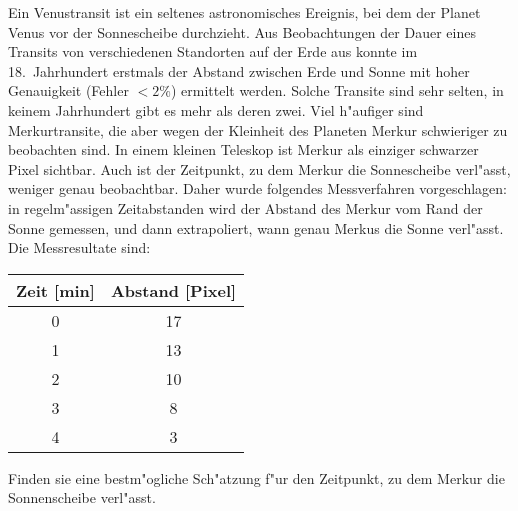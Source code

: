 Ein Venustransit ist ein seltenes astronomisches Ereignis, bei dem
der Planet Venus vor der Sonnescheibe durchzieht.
Aus Beobachtungen der Dauer eines Transits von verschiedenen Standorten
auf der Erde aus konnte im 18.~Jahrhundert erstmals der Abstand
zwischen Erde und Sonne mit hoher Genauigkeit (Fehler $< 2\%$) ermittelt
werden. Solche Transite sind sehr selten, in keinem Jahrhundert gibt es
mehr als deren zwei. Viel h"aufiger sind Merkurtransite, die aber wegen
der Kleinheit des Planeten Merkur schwieriger zu beobachten sind.
In einem kleinen Teleskop ist Merkur als einziger schwarzer Pixel
sichtbar. Auch ist der Zeitpunkt, zu dem Merkur die Sonnescheibe
verl"asst, weniger genau beobachtbar. Daher wurde folgendes Messverfahren
vorgeschlagen: in regelm"assigen Zeitabstanden wird der Abstand des
Merkur vom Rand der Sonne gemessen, und dann extrapoliert, wann genau
Merkus die Sonne verl"asst. Die Messresultate sind:
\begin{center}
\begin{tabular}{cc}
Zeit [min]&Abstand [Pixel]\\
\hline
0&17\\
1&13\\
2&10\\
3&8\\
4&3\\
\hline
\end{tabular}
\end{center}
Finden sie eine bestm"ogliche Sch"atzung f"ur den Zeitpunkt, zu dem
Merkur die Sonnenscheibe verl"asst.

